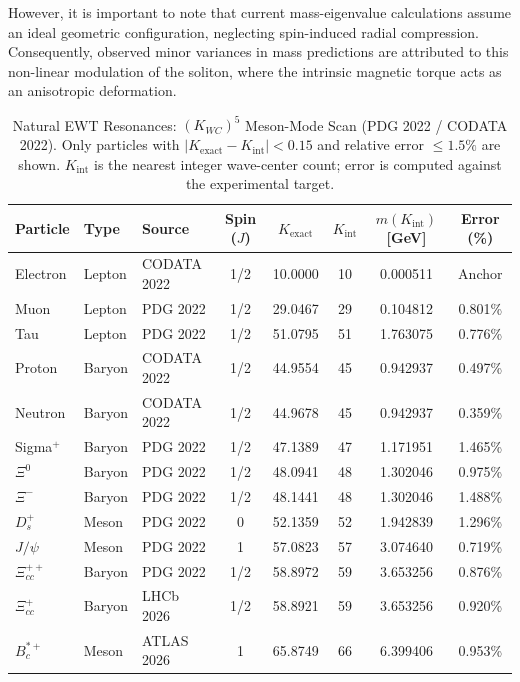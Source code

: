 \documentclass[10pt,a4paper]{article}
\begin{document}
However, it is important to note that current mass-eigenvalue calculations assume an ideal geometric configuration, neglecting spin-induced radial compression. Consequently, observed minor variances in mass predictions  are attributed to this non-linear modulation of the soliton, where the intrinsic magnetic torque acts as an anisotropic deformation.

\begin{table}[ht]
	\centering
	\small
	\caption{Natural EWT Resonances: $({K_{WC}})^5$ Meson-Mode Scan (PDG 2022 / CODATA 2022).
		Only particles with $|K_{\text{exact}} - K_{\text{int}}| < 0.15$ and relative error $\leq 1.5\%$ are shown.
		$K_{\text{int}}$ is the nearest integer wave-center count; error is computed against the experimental target.}
	\label{tab:meson_mode_scan}
	\begin{tabular}{lllccccc}
		\toprule
		\textbf{Particle} & \textbf{Type} & \textbf{Source} & \textbf{Spin ($J$)} &
		$K_{\text{exact}}$ & $K_{\text{int}}$ &
		\textbf{$m(K_{\text{int}})$ [GeV]} & \textbf{Error (\%)} \\
		\midrule
		Electron        & Lepton  & CODATA 2022 & 1/2 & 10.0000 & 10 & 0.000511  & Anchor \\
		Muon            & Lepton  & PDG 2022    & 1/2 & 29.0467 & 29 & 0.104812  & 0.801\% \\
		Tau             & Lepton  & PDG 2022    & 1/2 & 51.0795 & 51 & 1.763075  & 0.776\% \\
		Proton          & Baryon  & CODATA 2022 & 1/2 & 44.9554 & 45 & 0.942937  & 0.497\% \\
		Neutron         & Baryon  & CODATA 2022 & 1/2 & 44.9678 & 45 & 0.942937  & 0.359\% \\
		Sigma$^+$       & Baryon  & PDG 2022    & 1/2 & 47.1389 & 47 & 1.171951  & 1.465\% \\
		$\Xi^0$         & Baryon  & PDG 2022    & 1/2 & 48.0941 & 48 & 1.302046  & 0.975\% \\
		$\Xi^-$         & Baryon  & PDG 2022    & 1/2 & 48.1441 & 48 & 1.302046  & 1.488\% \\
		$D_s^+$         & Meson   & PDG 2022    & 0   & 52.1359 & 52 & 1.942839  & 1.296\% \\
		$J/\psi$        & Meson   & PDG 2022    & 1   & 57.0823 & 57 & 3.074640  & 0.719\% \\
		$\Xi_{cc}^{++}$ & Baryon  & PDG 2022    & 1/2 & 58.8972 & 59 & 3.653256  & 0.876\% \\
		$\Xi_{cc}^{+}$  & Baryon  & LHCb 2026   & 1/2 & 58.8921 & 59 & 3.653256  & 0.920\% \\
		$B_c^{*+}$      & Meson   & ATLAS 2026  & 1   & 65.8749 & 66 & 6.399406  & 0.953\% \\
		\bottomrule
	\end{tabular}
\end{table}
\end{document}
